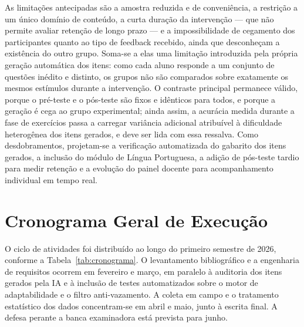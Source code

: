 \documentclass[10pt, a4paper, twocolumn]{article}
\begin{document}
As limitações antecipadas são a amostra reduzida e de conveniência, a restrição
a um único domínio de conteúdo, a curta duração da intervenção --- que não
permite avaliar retenção de longo prazo --- e a impossibilidade de cegamento dos
participantes quanto ao tipo de feedback recebido, ainda que desconheçam a
existência do outro grupo. Soma-se a elas uma limitação introduzida pela própria
geração automática dos itens: como cada aluno responde a um conjunto de questões
inédito e distinto, os grupos não são comparados sobre exatamente os mesmos
estímulos durante a intervenção. O contraste principal permanece válido, porque o
pré-teste e o pós-teste são fixos e idênticos para todos, e porque a geração é
cega ao grupo experimental; ainda assim, a acurácia medida durante a fase de
exercícios passa a carregar variância adicional atribuível à dificuldade
heterogênea dos itens gerados, e deve ser lida com essa ressalva. Como
desdobramentos, projetam-se a verificação automatizada do gabarito dos itens
gerados, a inclusão do módulo de Língua Portuguesa, a adição de pós-teste tardio
para medir retenção e a evolução do painel docente para acompanhamento individual
em tempo real.

\section{Cronograma Geral de Execução}
\label{sec:cronograma}

O ciclo de atividades foi distribuído ao longo do primeiro semestre de 2026,
conforme a Tabela~\ref{tab:cronograma}. O levantamento bibliográfico e a
engenharia de requisitos ocorrem em fevereiro e março, em paralelo à auditoria
dos itens gerados pela IA e à inclusão de testes automatizados sobre o motor de
adaptabilidade e o filtro anti-vazamento. A coleta em campo e o tratamento
estatístico dos dados concentram-se em abril e maio, junto à escrita final. A
defesa perante a banca examinadora está prevista para junho.
\end{document}
